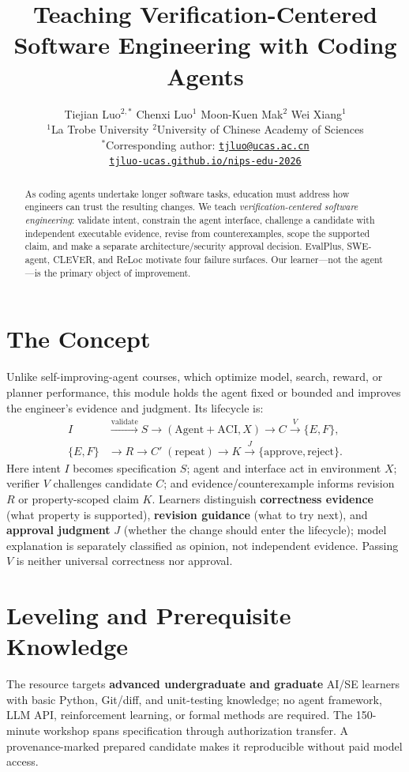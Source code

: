 \documentclass{article}
\title{Teaching Verification-Centered Software Engineering with Coding Agents}
\author{Tiejian Luo$^{2,\ast}$ \quad Chenxi Luo$^{1}$ \quad Moon-Kuen Mak$^{2}$ \quad Wei Xiang$^{1}$\\
$^{1}$La Trobe University \quad $^{2}$University of Chinese Academy of Sciences\\
$^{\ast}$Corresponding author: \href{mailto:tjluo@ucas.ac.cn}{\texttt{tjluo@ucas.ac.cn}}\\
\href{https://tjluo-ucas.github.io/nips-edu-2026/}{\texttt{tjluo-ucas.github.io/nips-edu-2026}}}
\begin{document}
\maketitle

\begin{abstract}
As coding agents undertake longer software tasks, education must address how engineers can trust the resulting changes. We teach \emph{verification-centered software engineering}: validate intent, constrain the agent interface, challenge a candidate with independent executable evidence, revise from counterexamples, scope the supported claim, and make a separate architecture/security approval decision. EvalPlus, SWE-agent, CLEVER, and ReLoc motivate four failure surfaces. Our learner---not the agent---is the primary object of improvement.
\end{abstract}

\section{The Concept}
Unlike self-improving-agent courses, which optimize model, search, reward, or planner performance, this module holds the agent fixed or bounded and improves the engineer's evidence and judgment. Its lifecycle is:
\[
\begin{aligned}
I &\xrightarrow{\mathrm{validate}} S \rightarrow (\mathrm{Agent{+}ACI},X) \rightarrow C \xrightarrow{V} \{E,F\},\\
\{E,F\} &\rightarrow R \rightarrow C'\;(\mathrm{repeat}) \rightarrow K \xrightarrow{J} \{\mathrm{approve,reject}\}.
\end{aligned}
\]
Here intent $I$ becomes specification $S$; agent and interface act in environment $X$; verifier $V$ challenges candidate $C$; and evidence/counterexample informs revision $R$ or property-scoped claim $K$. Learners distinguish \textbf{correctness evidence} (what property is supported), \textbf{revision guidance} (what to try next), and \textbf{approval judgment} $J$ (whether the change should enter the lifecycle); model explanation is separately classified as opinion, not independent evidence. Passing $V$ is neither universal correctness nor approval.

\section{Leveling and Prerequisite Knowledge}
The resource targets \textbf{advanced undergraduate and graduate} AI/SE learners with basic Python, Git/diff, and unit-testing knowledge; no agent framework, LLM API, reinforcement learning, or formal methods are required. The 150-minute workshop spans specification through authorization transfer. A provenance-marked prepared candidate makes it reproducible without paid model access.
\end{document}
